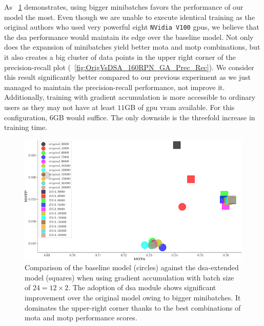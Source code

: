 As \figtext{}~\ref{fig:OrigVsDSA_160RPN_GA_MOTA_MOTP} demonstrates, using bigger minibatches favors the performance of our model the most. Even though we are unable to execute identical training as the original authors who used very powerful eight \texttt{NVidia V100} \glspl{gpu}, we believe that the \gls{dsa} performance would maintain its edge over the baseline model. Not only does the expansion of minibatches yield better \gls{mota} and \gls{motp} combinations, but it also creates a big cluster of data points in the upper right corner of the precision-recall plot (\figtext{}~\ref{fig:OrigVsDSA_160RPN_GA_Prec_Rec}). We consider this result significantly better compared to our previous experiment as we just managed to maintain the precision-recall performance, not improve it. Additionally, training with gradient accumulation is more accessible to ordinary users as they may not have at least $11$GB of \gls{gpu} \gls{vram} available. For this configuration, $6$GB would suffice. The only downside is the threefold increase in training time.

\begin{figure}[t]
    \centerline{\includegraphics[width=\linewidth]{figures/siamese_tracking/tracker_cmp_160_2x12_vs_160_2x2_DSA_GA_MOTA_MOTP.pdf}}
    \caption[\gls{dsa} evaluation with gradient accumulation - primary metrics]{Comparison of the baseline model (circles) against the \gls{dsa}-extended model (squares) when using gradient accumulation with batch size of $24 = 12 \times 2$. The adoption of \gls{dsa} module shows significant improvement over the original model owing to bigger minibatches. It dominates the upper-right corner thanks to the best combinations of \gls{mota} and \gls{motp} performance scores.}
    \label{fig:OrigVsDSA_160RPN_GA_MOTA_MOTP}
\end{figure}


